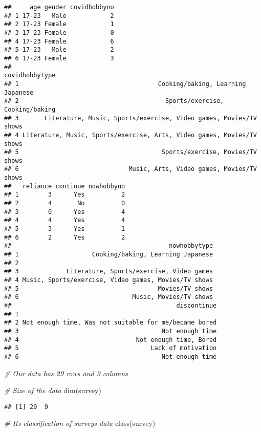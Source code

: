 \documentclass[
]{article}
\newenvironment{Shaded}{\begin{snugshade}}{\end{snugshade}}
\newcommand{\CommentTok}[1]{\textcolor[rgb]{0.56,0.35,0.01}{\textit{#1}}}
\newcommand{\FunctionTok}[1]{\textcolor[rgb]{0.00,0.00,0.00}{#1}}
\newcommand{\NormalTok}[1]{#1}
\begin{document}
\begin{verbatim}
##     age gender covidhobbyno
## 1 17-23   Male            2
## 2 17-23 Female            1
## 3 17-23 Female            0
## 4 17-23 Female            6
## 5 17-23   Male            2
## 6 17-23 Female            3
##                                                           covidhobbytype
## 1                                      Cooking/baking, Learning Japanese
## 2                                        Sports/exercise, Cooking/baking
## 3       Literature, Music, Sports/exercise, Video games, Movies/TV shows
## 4 Literature, Music, Sports/exercise, Arts, Video games, Movies/TV shows
## 5                                       Sports/exercise, Movies/TV shows
## 6                              Music, Arts, Video games, Movies/TV shows
##   reliance continue nowhobbyno
## 1        3      Yes          2
## 2        4       No          0
## 3        0      Yes          4
## 4        4      Yes          4
## 5        3      Yes          1
## 6        2      Yes          2
##                                           nowhobbytype
## 1                    Cooking/baking, Learning Japanese
## 2                                                     
## 3             Literature, Sports/exercise, Video games
## 4 Music, Sports/exercise, Video games, Movies/TV shows
## 5                                      Movies/TV shows
## 6                               Music, Movies/TV shows
##                                             discontinue
## 1                                                      
## 2 Not enough time, Was not suitable for me/became bored
## 3                                       Not enough time
## 4                                Not enough time, Bored
## 5                                    Lack of motivation
## 6                                       Not enough time
\end{verbatim}

\begin{Shaded}
\begin{Highlighting}[]
\CommentTok{\# Our data has 29 rows and 9 columns}

\CommentTok{\# Size of the data}
\FunctionTok{dim}\NormalTok{(survey)}
\end{Highlighting}
\end{Shaded}

\begin{verbatim}
## [1] 29  9
\end{verbatim}

\begin{Shaded}
\begin{Highlighting}[]
\CommentTok{\# R\textquotesingle{}s classification of survey\textquotesingle{}s data}
\FunctionTok{class}\NormalTok{(survey)}
\end{Highlighting}
\end{Shaded}
\end{document}
